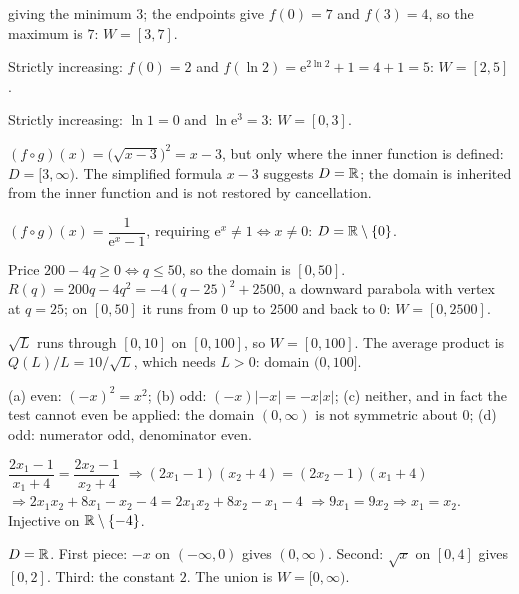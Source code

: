 \begin{solutions}
        giving the minimum $3$; the endpoints give $f(0)=7$ and $f(3)=4$,
        so the maximum is $7$: \;$W=[3,7]$.
  \item Strictly increasing: $f(0)=2$ and
        $f(\ln 2)=\mathrm{e}^{2\ln 2}+1=4+1=5$: \;$W=[2,5]$.
  \item Strictly increasing: $\ln 1=0$ and $\ln \mathrm{e}^{3}=3$:
        \;$W=[0,3]$.
  \item $(f\circ g)(x)=\bigl(\sqrt{x-3}\bigr)^{2}=x-3$, but only where the
        inner function is defined: \;$D=[3,\infty)$. The simplified formula
        $x-3$ suggests $D=\mathbb{R}$; the domain is inherited from the inner
        function and is not restored by cancellation.
  \item $(f\circ g)(x)=\dfrac{1}{\mathrm{e}^{x}-1}$, requiring
        $\mathrm{e}^{x}\neq1\iff x\neq0$: \;$D=\mathbb{R}\setminus\{0\}$.
  \item Price $200-4q\ge0\iff q\le50$, so the domain is $[0,50]$.
        $R(q)=200q-4q^{2}=-4(q-25)^{2}+2500$, a downward parabola with
        vertex at $q=25$; on $[0,50]$ it runs from $0$ up to $2500$ and
        back to $0$: \;$W=[0,2500]$.
  \item $\sqrt{L}$ runs through $[0,10]$ on $[0,100]$, so
        $W=[0,100]$. The average product is
        $Q(L)/L=10/\sqrt{L}$, which needs $L>0$: domain $(0,100]$.
  \item (a) even: $(-x)^{2}=x^{2}$; (b) odd:
        $(-x)|-x|=-x|x|$; (c) neither, and in fact the test cannot even be
        applied: the domain $(0,\infty)$ is not symmetric about $0$;
        (d) odd: numerator odd, denominator even.
  \item $\dfrac{2x_{1}-1}{x_{1}+4}=\dfrac{2x_{2}-1}{x_{2}+4}$
        $\Rightarrow(2x_{1}-1)(x_{2}+4)=(2x_{2}-1)(x_{1}+4)$
        $\Rightarrow 2x_{1}x_{2}+8x_{1}-x_{2}-4
        =2x_{1}x_{2}+8x_{2}-x_{1}-4$
        $\Rightarrow 9x_{1}=9x_{2}\Rightarrow x_{1}=x_{2}$. Injective on
        $\mathbb{R}\setminus\{-4\}$.
  \item $D=\mathbb{R}$. First piece: $-x$ on $(-\infty,0)$ gives $(0,\infty)$.
        Second: $\sqrt{x}$ on $[0,4]$ gives $[0,2]$. Third: the constant
        $2$. The union is \;$W=[0,\infty)$.
\end{solutions}

